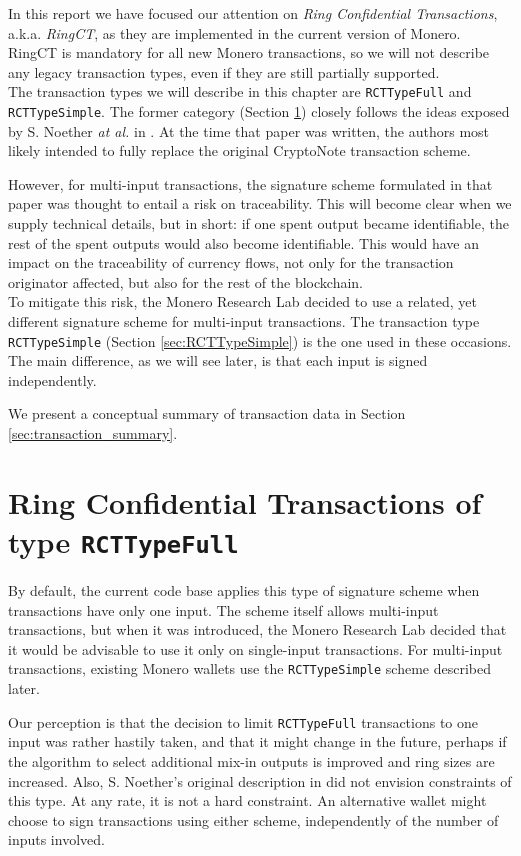 In this report we have focused our attention on {\em Ring Confidential Transactions}, a.k.a. {\em RingCT}, as they are implemented in the current version of Monero. RingCT is mandatory for all new Monero transactions, so we will not describe any legacy transaction types, even if they are still partially supported.
\\

The transaction types we will describe in this chapter are {\tt RCTTypeFull} and {\tt RCTTypeSimple}. The former category (Section \ref{sec:RCTTypeFull}) closely follows the ideas exposed by S. Noether {\em at al.} in \cite{ledger34}. At the time that paper was written, the authors most likely intended to fully replace the original CryptoNote transaction scheme.

However, for multi-input transactions, the signature scheme formulated in that paper was thought to entail a risk on traceability. This will become clear when we supply technical details, but in short: if one spent output became identifiable, the rest of the spent outputs would also become identifiable. This would have an impact on the traceability of currency flows, not only for the transaction originator affected, but also for the rest of the blockchain.
\\

To mitigate this risk, the Monero Research Lab decided to use a related, yet different signature scheme for multi-input transactions. The transaction type {\tt RCTTypeSimple} (Section \ref{sec:RCTTypeSimple}) is the one used in these occasions. The main difference, as we will see later, is that each input is signed independently.

We present a conceptual summary of transaction data in Section \ref{sec:transaction_summary}.


\section{Ring Confidential Transactions of type {\tt RCTTypeFull}}
\label{sec:RCTTypeFull}

By default, the current code base applies this type of signature scheme when transactions have only one input. The scheme itself allows multi-input transactions, but when it was introduced, the Monero Research Lab decided that it would be advisable to use it only on single-input transactions. For multi-input transactions, existing Monero wallets use the {\tt RCTTypeSimple} scheme described later.

Our perception is that the decision to limit {\tt RCTTypeFull} transactions to one input was rather hastily taken, and that it might change in the future, perhaps if the algorithm to select additional mix-in outputs is improved and ring sizes are increased. Also, S. Noether’s original description in \cite{ledger34} did not envision constraints of this type. At any rate, it is not a hard constraint. An alternative wallet might choose to sign transactions using either scheme, independently of the number of inputs involved.

